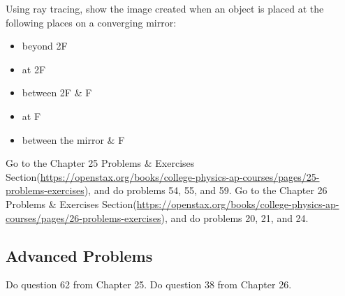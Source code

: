 \documentclass[11pt,addpoints]{exam}
\begin{document}
	\begin{questions}
		\question Using ray tracing, show the image created when an object is placed at the following places on a converging mirror:
		\begin{itemize}
			\item beyond 2F
			\item at 2F
			\item between 2F \& F
			\item at F
			\item between the mirror \& F
		\end{itemize}
		\question Go to the Chapter 25 Problems \& Exercises Section(\href{https://openstax.org/books/college-physics-ap-courses/pages/25-problems-exercises}{https://openstax.org/books/college-physics-ap-courses/pages/25-problems-exercises}), and do problems 54, 55, and 59.
		\question Go to the Chapter 26 Problems \& Exercises Section(\href{https://openstax.org/books/college-physics-ap-courses/pages/26-problems-exercises}{https://openstax.org/books/college-physics-ap-courses/pages/26-problems-exercises}), and do problems 20, 21, and 24.
		\subsection*{Advanced Problems}
		\question Do question 62 from Chapter 25.
		\question Do question 38 from Chapter 26.
	\end{questions}		
\end{document}
